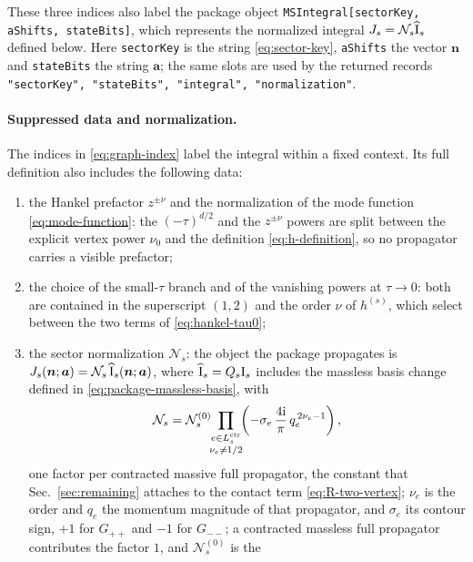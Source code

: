 \documentclass[11pt,a4paper]{article}
\numberwithin{table}{section}
\newcommand{\ii}{\mathrm i}
\newcommand{\cN}{\mathcal N}
\begin{document}
These three indices also label the package object
\texttt{MSIntegral[sectorKey, aShifts, stateBits]}, which represents the normalized integral
$J_s=\cN_s\widehat{\text I}_s$ defined below. Here
\texttt{sectorKey} is the string \eqref{eq:sector-key}, \texttt{aShifts} the vector $\bm n$ and
\texttt{stateBits} the string $\bm a$; the same slots are used by the returned records
\texttt{"sectorKey", "stateBits", "integral", "normalization"}.

\paragraph{Suppressed data and normalization.}
The indices in \eqref{eq:graph-index} label the integral within a fixed context. Its full
definition also includes the following data:
\begin{enumerate}
  \item the Hankel prefactor $z^{\pm\nu}$ and the normalization of the mode function
        \eqref{eq:mode-function}: the $(-\tau)^{d/2}$ and the $z^{\pm\nu}$ powers are split between
        the explicit vertex power $\nu_0$ and the definition \eqref{eq:h-definition}, so no
        propagator carries a visible prefactor;
  \item the choice of the small-$\tau$ branch and of the vanishing powers at $\tau\to0$: both are
        contained in the superscript $(1,2)$ and the order $\nu$ of $h^{(s)}$, which select between
        the two terms of \eqref{eq:hankel-tau0};
  \item the sector normalization $\cN_s$: the object the package propagates is
        $J_s(\bm n;\bm a)=\cN_s\,\widehat{\text I}_s(\bm n;\bm a)$, where
        $\widehat{\bm{\text I}}_s=Q_s\bm{\text I}_s$ includes the massless basis change
        defined in \eqref{eq:package-massless-basis}, with
        \begin{equation}
          \cN_s=\cN_s^{(0)}\!\!\prod_{\substack{e\in L_s^{\rm ctr}\\[1pt]\nu_e\neq 1/2}}\!\!
          \left(-\sigma_e\,\frac{4\ii}{\pi}\,q_e^{\,2\nu_e-1}\right),
          \label{eq:sector-normalization}
        \end{equation}
        one factor per contracted massive full propagator, the constant that
        Sec.~\ref{sec:remaining} attaches to the contact term \eqref{eq:R-two-vertex}; $\nu_e$ is the
        order and $q_e$ the momentum magnitude of that propagator, and $\sigma_e$ its contour sign,
        $+1$ for $G_{++}$ and $-1$ for $G_{--}$; a
        contracted massless full propagator contributes the factor $1$, and $\cN_s^{(0)}$ is the

\end{enumerate}
\end{document}
